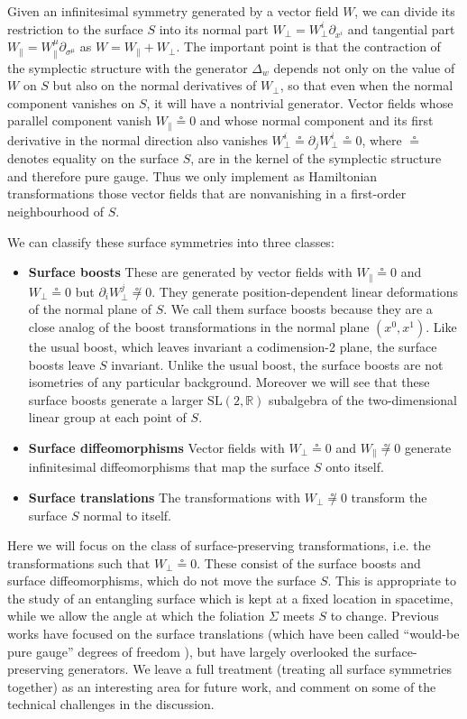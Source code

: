\documentclass[a4paper,11pt]{article}
\def\pa{\partial}
\newcommand{\slr}{\text{SL}(2,\mathbb{R})}
\begin{document}
Given an infinitesimal symmetry generated by a vector field $W$, we can divide its restriction to the surface $S$ into its normal part 
$W_\perp  ={W}^i_\perp\partial_{x^i}$ and tangential part 
$W_\parallel = W_\parallel^\mu \pa_{\sigma^\mu}$ as $W =  W_\parallel +  W_\perp$.
The important point is that  the contraction of the symplectic structure with the generator $\Delta_w$ depends not only on the value of $W$ on $S$ but  also on the normal derivatives of $W_\perp$, so that even when the normal component vanishes on $S$, it will have a nontrivial generator.
Vector fields whose parallel component vanish $W_\parallel\circeq 0$ and whose normal component and its first derivative in the normal direction also vanishes ${W}^{i}_\perp \circeq \partial_{j}{W}^{i}_\perp \circeq 0$, where $\circeq$ denotes equality on the surface $S$, are in the kernel of the symplectic structure and therefore pure gauge.
Thus we only implement as Hamiltonian transformations those vector fields that are nonvanishing in a first-order neighbourhood of $S$.

We can classify these surface symmetries into three classes:
\begin{itemize}
\item \textbf{Surface boosts} These are generated by vector fields with $ W_\parallel \circeq 0$ and $ W_\perp \circeq 0$ but $\partial_i W^j_\perp \not\circeq  0$. 
They generate position-dependent linear deformations of the normal plane of $S$. 
We call them surface boosts because they are a close analog of the boost transformations in the normal plane $(x^0,x^1)$.
Like the usual boost, which leaves invariant a codimension-2 plane, the surface boosts leave $S$ invariant.
Unlike the usual boost, the surface boosts are not isometries of any particular background.
Moreover we will see that these surface boosts generate a larger $\slr$ subalgebra of the two-dimensional linear group at each point of $S$.
\item \textbf{Surface diffeomorphisms} Vector fields with $ W_\perp \circeq 0$ and $W_\parallel \not\circeq 0$ generate infinitesimal diffeomorphisms that map the surface $S$ onto itself.
\item \textbf{Surface translations} The transformations with $ W_\perp  \not\circeq 0$ transform the surface $S$ normal to itself. 
\end{itemize}
Here we will focus on the class of surface-preserving transformations, i.e. the transformations such that $W_\perp \circeq 0$. 
These consist of the surface boosts and surface diffeomorphisms, which do not move the surface $S$. 
This is appropriate to the study of an entangling surface which is kept at a fixed location in spacetime, while we allow the angle at which the foliation $\Sigma$ meets $S$ to change.
Previous works have focused on the surface translations (which have been called ``would-be pure gauge'' degrees of freedom \cite{Carlip:1994gy}), but have largely overlooked the surface-preserving generators.
We leave a full treatment (treating all surface symmetries together) as an interesting area for future work, and comment on some of the technical challenges in the discussion.
\end{document}
